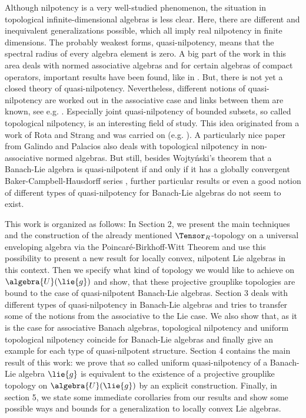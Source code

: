\documentclass[
11pt,                          %
english                        %
]{article}
\begin{document}
Although nilpotency is a very well-studied phenomenon, the situation in topological 
infinite-dimensional algebras is less clear. Here, there are different and 
inequivalent generalizations possible, which all imply real nilpotency in finite 
dimensions. The probably weakest forms, quasi-nilpotency, means that the spectral 
radius of every algebra element is zero. A big part of the work in this area deals 
with normed associative algebras and for certain algebras of compact operators, 
important results have been found, like in \cite{shulman.turovskii:2000a}. But, there 
is not yet a closed theory of quasi-nilpotency. Nevertheless, different notions of 
quasi-nilpotency are worked out in the associative case and links between them are 
known, see e.g. \cite{dixon:1991a, mueller:1994a, dixon.mueller:1992a}. Especially 
joint quasi-nilpotency of bounded subsets, so called topological nilpotency, is an 
interesting field of study. This idea originated from a work of Rota and Strang 
\cite{rota.strang:1960a} and was carried on (e.g. \cite{mueller:1997a}). A 
particularly nice paper from Galindo and Palacios \cite{galindo.palacios:2012a} also 
deals with topological nilpotency in non-associative normed algebras. But still, 
besides Wojty\'nski's theorem that a Banach-Lie algebra is quasi-nilpotent if and 
only if it has a globally convergent Baker-Campbell-Hausdorff series 
\cite{wojtynski:1998a}, further particular results or even a good notion of different 
types of quasi-nilpotency for Banach-Lie algebras do not seem to exist.

This work is organized as follows: In Section 2, we present the main techniques and 
the construction of the already mentioned $\Tensor_R$-topology on a universal 
enveloping algebra via the Poincar\'e-Birkhoff-Witt Theorem and use this possibility 
to present a new result for locally convex, nilpotent Lie algebras in this context. 
Then we specify what kind of topology we would like to achieve on $\algebra{U}
(\lie{g})$ and show, that these projective grouplike topologies are bound to the case 
of quasi-nilpotent Banach-Lie algebras. Section 3 deals with different types of 
quasi-nilpotency in Banach-Lie algebras and tries to transfer some of the notions 
from the associative to the Lie case. We also show that, as it is the case for 
associative Banach algebras, topological nilpotency and uniform topological 
nilpotency coincide for Banach-Lie algebras and finally give an example for each type 
of quasi-nilpotent structure. Section 4 contains the main result of this 
work: we prove that so called uniform quasi-nilpotency of a Banach-Lie algebra 
$\lie{g}$ is equivalent to the existence of a projective grouplike topology on 
$\algebra{U}(\lie{g})$ by an explicit construction. Finally, in section 5, we state 
some immediate corollaries from our results and show some possible ways and bounds 
for a generalization to locally convex Lie algebras.
\end{document}
